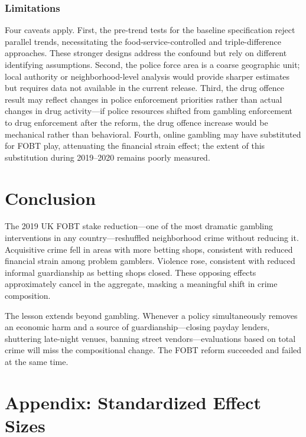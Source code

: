 \documentclass[12pt]{article}
\begin{document}
\subsubsection*{Limitations} Four caveats apply. First, the pre-trend tests for the baseline specification reject parallel trends, necessitating the food-service-controlled and triple-difference approaches. These stronger designs address the confound but rely on different identifying assumptions. Second, the police force area is a coarse geographic unit; local authority or neighborhood-level analysis would provide sharper estimates but requires data not available in the current release. Third, the drug offence result may reflect changes in police enforcement priorities rather than actual changes in drug activity---if police resources shifted from gambling enforcement to drug enforcement after the reform, the drug offence increase would be mechanical rather than behavioral. Fourth, online gambling may have substituted for FOBT play, attenuating the financial strain effect; the extent of this substitution during 2019--2020 remains poorly measured.


\section{Conclusion}

The 2019 UK FOBT stake reduction---one of the most dramatic gambling interventions in any country---reshuffled neighborhood crime without reducing it. Acquisitive crime fell in areas with more betting shops, consistent with reduced financial strain among problem gamblers. Violence rose, consistent with reduced informal guardianship as betting shops closed. These opposing effects approximately cancel in the aggregate, masking a meaningful shift in crime composition.

The lesson extends beyond gambling. Whenever a policy simultaneously removes an economic harm and a source of guardianship---closing payday lenders, shuttering late-night venues, banning street vendors---evaluations based on total crime will miss the compositional change. The FOBT reform succeeded and failed at the same time.

\label{apep_main_text_end}

\newpage


\newpage
\appendix
\section*{Appendix: Standardized Effect Sizes}

\end{document}

